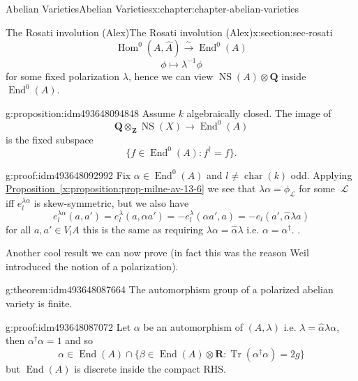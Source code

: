 \documentclass[oneside,10pt,]{book}
\numberwithin{equation}{section}
\newcommand{\sheaf}[1]{\operatorname{\mathcal{#1}}}
\newcommand{\inv}{^{-1}}
\newcommand{\ZZ}{\mathbf{Z}}
\newcommand{\QQ}{\mathbf{Q}}
\newcommand{\RR}{\mathbf{R}}
\DeclareMathOperator{\End}{End}
\DeclareMathOperator{\Hom}{Hom}
\DeclareMathOperator{\characteristic}{char}
\DeclareMathOperator{\trace}{Tr}
\DeclareMathOperator{\NS}{NS}
\begin{document}
\begin{chapterptx}{Abelian Varieties}{}{Abelian Varieties}{}{}{x:chapter:chapter-abelian-varieties}
\begin{sectionptx}{The Rosati involution (Alex)}{}{The Rosati involution (Alex)}{}{}{x:section:sec-rosati}
\begin{equation*}
\Hom^0(A, \hat A) \xrightarrow{\sim} \End^0(A)
\end{equation*}
%
\begin{equation*}
\phi \mapsto \lambda\inv \phi
\end{equation*}
for some fixed polarization \(\lambda\), hence we can view \(\NS(A)\otimes \QQ\) inside \(\End^0(A)\).%
\begin{proposition}{}{}{g:proposition:idm493648094848}%
Assume \(k\) algebraically closed. The image of%
\begin{equation*}
\QQ \otimes_\ZZ \NS(X) \to \End^0(A)
\end{equation*}
is the fixed subspace%
\begin{equation*}
\{f \in \End^0(A) : f^\dagger = f\}\text{.}
\end{equation*}
%
\end{proposition}
\begin{proofptx}{}{g:proof:idm493648092992}
Fix \(\alpha \in \End^0(A)\) and \(l\ne \characteristic(k)\) odd. Applying \hyperref[x:proposition:prop-milne-av-13-6]{Proposition~\ref{x:proposition:prop-milne-av-13-6}} we see that \(\lambda \alpha = \phi_{\sheaf L}\) for some \(\sheaf L\) iff \(e^{\lambda\alpha}_l\) is skew-symmetric, but we also have%
\begin{equation*}
e_l^{\lambda\alpha}(a,a')=  e_l^{\lambda}(a,\alpha a') = -e_l^\lambda(\alpha a',a) = -e_l(a', \hat\alpha \lambda a)
\end{equation*}
for all \(a,a' \in V_lA\) this is the same as requiring \(\lambda\alpha = \hat \alpha \lambda\) i.e. \(\alpha = \alpha^\dagger\). .%
\end{proofptx}
Another cool result we can now prove (in fact this was the reason Weil introduced the notion of a polarization).%
\begin{theorem}{}{}{g:theorem:idm493648087664}%
The automorphism group of a polarized abelian variety is finite.%
\end{theorem}
\begin{proofptx}{}{g:proof:idm493648087072}
Let \(\alpha\) be an automorphism of \((A, \lambda)\) i.e. \(\lambda =\hat \alpha  \lambda \alpha\), then \(\alpha^\dagger \alpha= 1\) and so%
\begin{equation*}
\alpha \in \End(A)\cap \{\beta \in \End(A) \otimes \RR: \trace(\alpha^\dagger \alpha) = 2g\}
\end{equation*}
but \(\End(A)\) is discrete inside the compact RHS.%
\end{proofptx}
\end{sectionptx}

\end{chapterptx}
\end{document}

